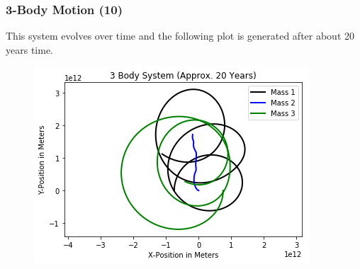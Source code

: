 \documentclass{beamer}
\begin{document}
\begin{frame}
\frametitle{3-Body Motion (10)}
This system evolves over time and the following plot is generated after about 20 years time.
\begin{figure}
\begin{center}
\includegraphics[width=0.90\linewidth]{3BodyDynamics8.png}
\end{center}
\end{figure}
\end{frame}
\end{document}
